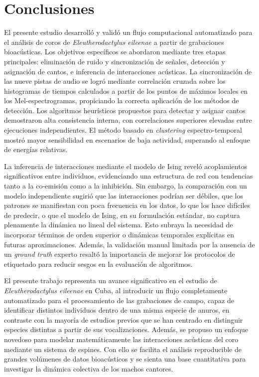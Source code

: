 \chapter*{Conclusiones}\label{chapter:conclusions}


El presente estudio desarrolló y validó un flujo computacional 
automatizado para el análisis de coros de \textit{Eleutherodactylus 
eileenae} a partir de grabaciones bioacústicas. Los objetivos 
específicos se abordaron mediante tres etapas principales: 
eliminación de ruido y sincronización de señales, detección y 
asignación de cantos, e 
inferencia de interacciones acústicas. La sincronización de las 
nueve pistas de audio se logró mediante 
correlación cruzada sobre los histogramas de tiempos calculados a partir de 
los puntos de máximos locales en los Mel-espectrogramas, 
propiciando la correcta aplicación de los métodos de detección. 
Los algoritmos heurísticos propuestos para detectar y asignar 
cantos demostraron alta consistencia interna, con correlaciones 
superiores elevadas entre ejecuciones independientes. El método 
basado en \textit{clustering} espectro-temporal mostró mayor 
sensibilidad en escenarios de baja actividad, superando al 
enfoque de energías relativas.

La inferencia de interacciones mediante el modelo de Ising 
reveló acoplamientos significativos entre individuos, 
evidenciando una estructura de red con tendencias tanto a la 
co-emisión como a la inhibición. Sin embargo, la comparación con 
un modelo independiente sugirió que las interacciones podrían 
ser débiles, que los patrones se manifiestan con poca frecuencia 
en los datos, lo que los hace difíciles de predecir, 
o que el modelo de Ising, en su formulación estándar, 
no captura plenamente la dinámica no lineal del sistema. Esto 
subraya la necesidad de incorporar términos de orden superior o 
dinámicas temporales explícitas en futuras aproximaciones. 
Además, la validación manual limitada por la ausencia de un 
\textit{ground truth} experto resaltó la importancia de mejorar 
los protocolos de etiquetado para reducir sesgos en la 
evaluación de algoritmos.

El presente trabajo representa un avance significativo en el 
estudio de \emph{Eleutherodactylus eileenae} en Cuba, al 
introducir un flujo completamente automatizado para el 
procesamiento de las grabaciones de campo,
capaz de identificar distintos individuos dentro de una misma 
especie de anuros, en contraste con la mayoría de estudios 
previos que se han centrado en distinguir especies distintas a 
partir de sus vocalizaciones.
Además, se propuso un enfoque novedoso para modelar 
matemáticamente las interacciones acústicas del coro mediante un 
sistema de espines. Con ello se facilita el análisis 
reproducible de grandes volúmenes de datos bioacústicos y se 
sienta una base cuantitativa para investigar la dinámica 
colectiva de los machos cantores.